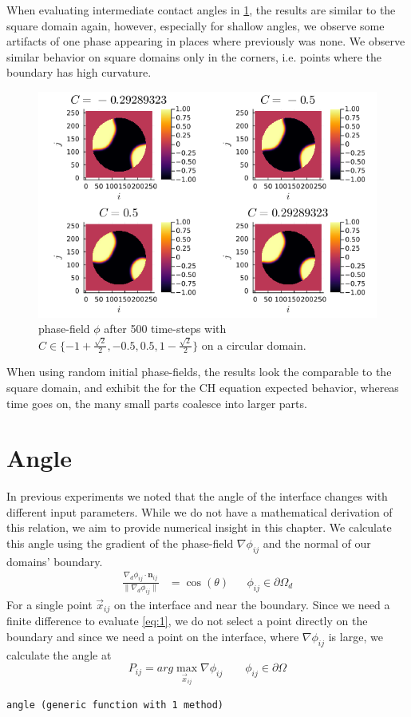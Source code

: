 \documentclass{mimosis}
\begin{document}
When evaluating intermediate contact angles in \ref{fig:angle-multiplec}, the results are similar to the square domain again, however, especially for shallow angles, we observe some artifacts of one phase appearing in places where previously was none. We observe similar behavior on square domains only in the corners, i.e. points where the boundary has high curvature.
\begin{figure}[htbp]
\centering
\includegraphics[width=.9\linewidth]{images/angle-multiplec.png}
\caption{\label{fig:angle-multiplec}phase-field \(\phi\) after 500 time-steps with \(C \in \{-1 + \frac{\sqrt{2}}{2} , -0.5 , 0.5 , 1 - \frac{\sqrt{2}}{2} \}\) on a circular domain.}
\end{figure}



When using random initial phase-fields, the results look the comparable to the square domain, and exhibit the for the CH equation expected behavior, whereas time goes on, the many small parts coalesce into larger parts.
\chapter{Angle}
\label{sec:org4bce6d3}
In previous experiments we noted that the angle of the interface changes with different input parameters. While we do not have a mathematical derivation of this relation, we aim to provide numerical insight in this chapter. We calculate this angle using the gradient of the phase-field \(\nabla \phi_{ij}\) and the normal of our domains' boundary.
\begin{align}
\label{eq:1}
\frac{\nabla_d \phi_{ij} \cdot \mathbf{n}_{ij}}{\|\nabla_{d} \phi_{ij}\|} &= \cos(\theta)& & \phi_{ij} \in \partial\Omega_{d}
\end{align}
For a single point \(\vec{x}_{ij}\) on the interface and near the boundary. Since we need a finite difference to evaluate \ref{eq:1}, we do not select a point directly on the boundary and since we need a point on the interface, where \(\nabla \phi_{ij}\) is large, we calculate the angle at
\begin{equation}
\label{eq:2}
P_{ij} = arg\max_{\vec{x}_{ij}} \nabla \phi_{ij} \qquad \phi_{ij} \in \partial \Omega
\end{equation}
\label{angle-function}
\begin{verbatim}
angle (generic function with 1 method)
\end{verbatim}
\end{document}
